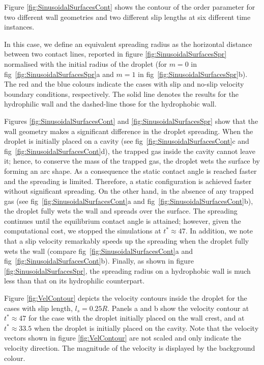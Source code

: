 \documentclass[review]{elsarticle}
\begin{document}
Figure \ref{fig:SinusoidalSurfacesCont} shows the contour of the order parameter for two different wall geometries and two different slip lengths at six different time instances.

In this case, we define an equivalent spreading radius as the horizontal distance between two contact lines, reported in figure \ref{fig:SinusoidalSurfacesSpr}  normalised with the initial radius of the droplet (for $m=0$ in fig~\ref{fig:SinusoidalSurfacesSpr}a and $m=1$ in fig~\ref{fig:SinusoidalSurfacesSpr}b). 
The red and the blue colours indicate the cases with slip and no-slip velocity boundary conditions, respectively. The solid line denotes the results for the hydrophilic wall and the dashed-line those for the hydrophobic wall. 

Figures \ref{fig:SinusoidalSurfacesCont} and \ref{fig:SinusoidalSurfacesSpr} show that the wall geometry makes a significant difference in the droplet spreading. When the droplet is initially placed on a cavity (see fig~\ref{fig:SinusoidalSurfacesCont}c and fig~\ref{fig:SinusoidalSurfacesCont}d), the trapped gas inside the cavity cannot leave it; hence, to conserve the mass of the trapped gas, the droplet wets the surface by forming an arc shape. As a consequence the static contact angle is reached faster and the spreading is limited. Therefore, a static configuration is achieved faster without significant spreading. On the other hand, in the absence of any trapped gas (see fig~\ref{fig:SinusoidalSurfacesCont}a and fig~\ref{fig:SinusoidalSurfacesCont}b), the droplet fully wets the wall and spreads over the surface. The spreading  continues until the equilibrium contact angle is attained; however, given  the computational cost, we stopped the simulations at $t^*\approx 47$. In addition, we note that a slip velocity remarkably speeds up the spreading when the droplet fully wets the wall (compare fig~\ref{fig:SinusoidalSurfacesCont}a and fig~\ref{fig:SinusoidalSurfacesCont}b). Finally, as shown in figure \ref{fig:SinusoidalSurfacesSpr}, the spreading radius on a hydrophobic wall is much less than that on its hydrophilic counterpart. 

Figure \ref{fig:VelContour} depicts the velocity contours inside the droplet for the cases with slip length, $l_s=0.25R$. Panels a and b show the velocity contour at $t^*\approx 47$ for the case with the droplet initially placed on the wall crest, and  at $t^*\approx 33.5$  when the droplet is initially placed on the cavity. Note that the velocity vectors shown in figure \ref{fig:VelContour} are not scaled and only indicate the velocity direction. The magnitude of the velocity is displayed by the background colour.
\end{document}
